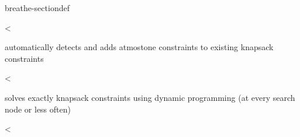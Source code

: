 \documentclass[letterpaper,10pt,openany,oneside,english]{sphinxmanual}
\begin{document}
\begin{fulllineitems}
\begin{sphinxuseclass}{breathe-sectiondef}
\begin{fulllineitems}
\label{\detokenize{ref/ref_cpp:_CPPv4N8ToulBar210knapsackDPE}}\label{\detokenize{ref/ref_cpp:_CPPv3N8ToulBar210knapsackDPE}}\label{\detokenize{ref/ref_cpp:_CPPv2N8ToulBar210knapsackDPE}}\label{\detokenize{ref/ref_cpp:ToulBar2::knapsackDP__i}}
\pysigstartsignatures
\pysigstartmultiline
{}
\pysigstopmultiline
\pysigstopsignatures
\sphinxAtStartPar
\textless{} 

\sphinxAtStartPar
automatically detects and adds at\sphinxhyphen{}most\sphinxhyphen{}one constraints to existing knapsack constraints 

\end{fulllineitems}


\begin{fulllineitems}
\label{\detokenize{ref/ref_cpp:_CPPv4N8ToulBar28divNbSolE}}\label{\detokenize{ref/ref_cpp:_CPPv3N8ToulBar28divNbSolE}}\label{\detokenize{ref/ref_cpp:_CPPv2N8ToulBar28divNbSolE}}\label{\detokenize{ref/ref_cpp:ToulBar2::divNbSol__unsigned-i}}
\pysigstartsignatures
\pysigstartmultiline
{}
\pysigstopmultiline
\pysigstopsignatures
\sphinxAtStartPar
\textless{} 

\sphinxAtStartPar
solves exactly knapsack constraints using dynamic programming (at every search node or less often) 

\end{fulllineitems}


\begin{fulllineitems}
\label{\detokenize{ref/ref_cpp:_CPPv4N8ToulBar28divBoundE}}\label{\detokenize{ref/ref_cpp:_CPPv3N8ToulBar28divBoundE}}\label{\detokenize{ref/ref_cpp:_CPPv2N8ToulBar28divBoundE}}\label{\detokenize{ref/ref_cpp:ToulBar2::divBound__unsigned-i}}
\pysigstartsignatures
\pysigstartmultiline
{}
\pysigstopmultiline
\pysigstopsignatures
\sphinxAtStartPar
\textless{} 


\end{fulllineitems}
\end{sphinxuseclass}
\end{fulllineitems}
\end{document}
